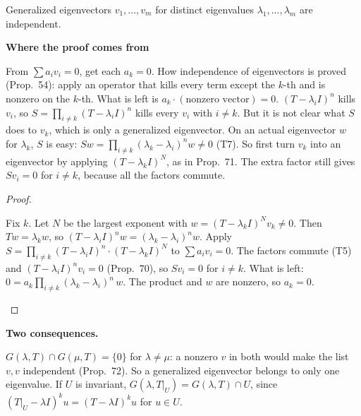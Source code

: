 \documentclass[10pt]{scrartcl}
\newenvironment{motive}{\begin{mdframed}[style=thinkbox]\textbf{\color{OliveGreen!75!black}Where the proof comes from}\begin{description}[leftmargin=0.9em,labelindent=0pt,itemsep=2pt,topsep=2pt,font=\normalfont\bfseries\color{OliveGreen!70!black}]}{\end{description}\end{mdframed}}
\newenvironment{steps}{\begin{enumerate}[label=\arabic*.,leftmargin=1.5em,itemsep=2pt,topsep=2pt]}{\end{enumerate}}
\begin{document}
\begin{proposition*}
  Generalized eigenvectors $v_1,\dots,v_m$ for distinct eigenvalues $\lambda_1,\dots,\lambda_m$ are independent.
\end{proposition*}
\begin{motive}
  \ii[Want.] From $\sum a_iv_i=0$, get each $a_k=0$.
  \ii[Know.] How independence of eigenvectors is proved (Prop.~54): apply an operator that kills every term except the $k$-th and is nonzero on the $k$-th. What is left is $a_k\cdot(\text{nonzero vector})=0$.
   $(T-\lambda_iI)^n$ kills $v_i$, so $S=\prod_{i\ne k}(T-\lambda_iI)^n$ kills every $v_i$ with $i\ne k$. But it is not clear what $S$ does to $v_k$, which is only a generalized eigenvector.
   On an actual eigenvector $w$ for $\lambda_k$, $S$ is easy: $Sw=\prod_{i\ne k}(\lambda_k-\lambda_i)^nw\ne0$ (T7). So first turn $v_k$ into an eigenvector by applying $(T-\lambda_kI)^N$, as in Prop.~71. The extra factor still gives $Sv_i=0$ for $i\ne k$, because all the factors commute.
\end{motive}
\begin{proof}
  \begin{steps}
    \ii Fix $k$. Let $N$ be the largest exponent with $w=(T-\lambda_kI)^Nv_k\ne0$. Then $Tw=\lambda_kw$, so $(T-\lambda_iI)^nw=(\lambda_k-\lambda_i)^nw$.
    \ii Apply $S=\prod_{i\ne k}(T-\lambda_iI)^n\cdot(T-\lambda_kI)^N$ to $\sum a_iv_i=0$. The factors commute (T5) and $(T-\lambda_iI)^nv_i=0$ (Prop.~70), so $Sv_i=0$ for $i\ne k$.
    \ii What is left: $0=a_k\prod_{i\ne k}(\lambda_k-\lambda_i)^n\,w$. The product and $w$ are nonzero, so $a_k=0$.
  \end{steps}
\end{proof}

\textbf{Two consequences.}
\begin{itemize}
  \ii $G(\lambda,T)\cap G(\mu,T)=\{0\}$ for $\lambda\ne\mu$: a nonzero $v$ in both would make the list $v,v$ independent (Prop.~72). So a generalized eigenvector belongs to only one eigenvalue.
  \ii If $U$ is invariant, $G(\lambda,T|_U)=G(\lambda,T)\cap U$, since $(T|_U-\lambda I)^ku=(T-\lambda I)^ku$ for $u\in U$.
\end{itemize}
\end{document}

